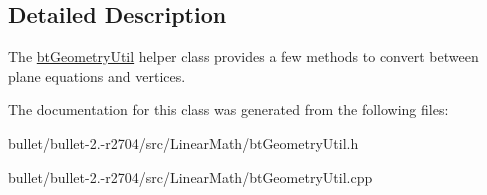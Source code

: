 \subsection{Detailed Description}
The \hyperlink{classbt_geometry_util}{bt\+Geometry\+Util} helper class provides a few methods to convert between plane equations and vertices. 

The documentation for this class was generated from the following files\+:\begin{DoxyCompactItemize}
\item 
bullet/bullet-\/2.-\/r2704/src/\+Linear\+Math/bt\+Geometry\+Util.\+h\item 
bullet/bullet-\/2.-\/r2704/src/\+Linear\+Math/bt\+Geometry\+Util.\+cpp\end{DoxyCompactItemize}
